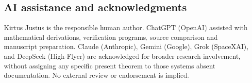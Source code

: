 \documentclass[
  10pt,
  a4paper,
]{article}
\begin{document}
\subsection{AI assistance and acknowledgments}\label{ai-assistance-and-acknowledgments}

Kirtus Justus is the responsible human author. ChatGPT (OpenAI) assisted with mathematical derivations, verification programs, source comparison and manuscript preparation. Claude (Anthropic), Gemini (Google), Grok (SpaceXAI), and DeepSeek (High-Flyer) are acknowledged for broader research involvement, without assigning any specific present theorem to those systems absent documentation. No external review or endorsement is implied.
\end{document}
